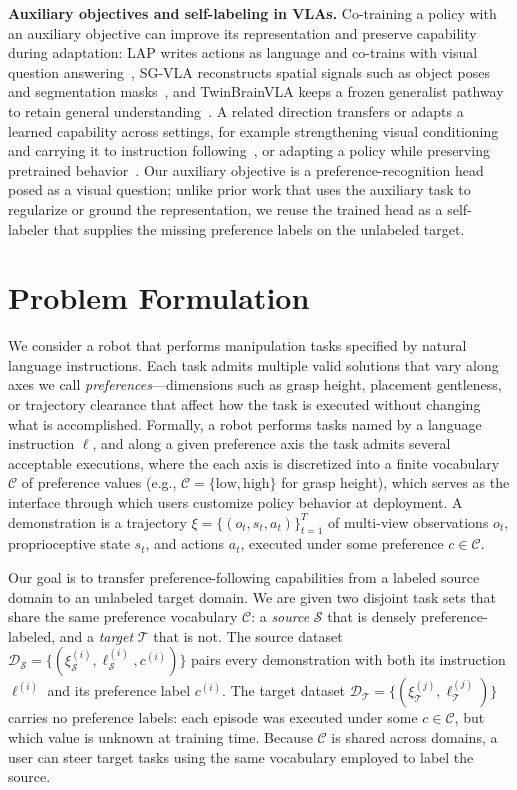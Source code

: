 \documentclass{article}
\begin{document}
\textbf{Auxiliary objectives and self-labeling in VLAs.}
Co-training a policy with an auxiliary objective can improve its representation and preserve capability during adaptation: LAP writes actions as language and co-trains with visual question answering~\citep{zha2026lap}, SG-VLA reconstructs spatial signals such as object poses and segmentation masks~\citep{tu2026sgvla}, and TwinBrainVLA keeps a frozen generalist pathway to retain general understanding~\citep{yu2026twinbrainvla}.
A related direction transfers or adapts a learned capability across settings, for example strengthening visual conditioning and carrying it to instruction following~\citep{chen2026vista}, or adapting a policy while preserving pretrained behavior~\citep{zhong2026vlaopd}.
Our auxiliary objective is a preference-recognition head posed as a visual question; unlike prior work that uses the auxiliary task to regularize or ground the representation, we reuse the trained head as a self-labeler that supplies the missing preference labels on the unlabeled target.


\section{Problem Formulation}
\label{sec:formulation}

We consider a robot that performs manipulation tasks specified by natural language instructions.
Each task admits multiple valid solutions that vary along axes we call \emph{preferences}---dimensions such as grasp height, placement gentleness, or trajectory clearance that affect how the task is executed without changing what is accomplished.
Formally, a robot performs tasks named by a language instruction $\ell$, and along a given preference axis the task admits several acceptable executions, where the each axis is discretized into a finite vocabulary $\mathcal{C}$ of preference values (e.g., $\mathcal{C}=\{\mathrm{low},\mathrm{high}\}$ for grasp height), which serves as the interface through which users customize policy behavior at deployment.
  A demonstration is a trajectory $\xi=\{(o_t,s_t,a_t)\}_{t=1}^{T}$ of multi-view observations $o_t$, proprioceptive state $s_t$, and actions $a_t$, executed under some preference $c\in\mathcal{C}$.


Our goal is to transfer preference-following capabilities from a labeled source domain to an unlabeled target domain.
We are given two disjoint task sets that share the same preference vocabulary $\mathcal{C}$: a \emph{source} $\mathcal{S}$ that is densely preference-labeled, and a \emph{target} $\mathcal{T}$ that is not.
The source dataset $\mathcal{D}_{\mathcal{S}}=\{(\xi_{\mathcal{S}}^{(i)},\ell_{\mathcal{S}}^{(i)},c^{(i)})\}$ pairs every demonstration with both its instruction $\ell^{(i)}$ and its preference label $c^{(i)}$.
The target dataset $\mathcal{D}_{\mathcal{T}}=\{(\xi_{\mathcal{T}}^{(j)},\ell_{\mathcal{T}}^{(j)})\}$ carries no preference labels: each episode was executed under some $c\in\mathcal{C}$, but which value is unknown at training time.
Because $\mathcal{C}$ is shared across domains, a user can steer target tasks using the same vocabulary employed to label the source.
\end{document}
